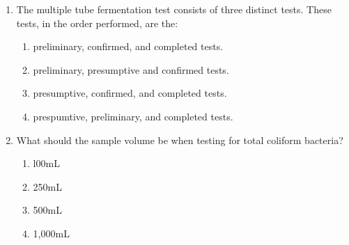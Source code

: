 \documentclass{article}
\begin{document}
\begin{enumerate}[1.]
\item The multiple tube fermentation test consists of three distinct tests. These tests, in the order performed, are the:
\begin{enumerate}
\item preliminary, confirmed, and completed tests.
\item preliminary, presumptive and confirmed tests.
\item presumptive, confirmed, and completed tests.
\item prespumtive, preliminary, and completed tests.
\end{enumerate}

\item What should the sample volume be when testing for total coliform bacteria?
\begin{enumerate}
\item l00mL
\item 250mL
\item 500mL
\item 1,000mL
\end{enumerate}


\end{enumerate}
\end{document}

